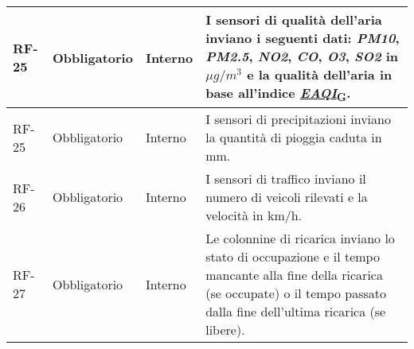 \begin{longtable}{|>{\centering\arraybackslash}m{}|>{\centering\arraybackslash}m{}|>{\centering\arraybackslash}m{}|>{\centering\arraybackslash}m{}|}
	RF-25           & Obbligatorio        & Interno                                                                                                           & I sensori di qualità dell'aria inviano i seguenti dati: \textit{PM10}, \textit{PM2.5}, \textit{NO2}, \textit{CO}, \textit{O3}, \textit{SO2} in $\mu g/m^3$ e la qualità dell'aria in base all'indice \href{https://7last.github.io/docs/rtb/documentazione-interna/glossario\#european-air-quality-index}{\textit{EAQI}\textsubscript{G}}.                                                                                                                                                           \\\hline
	RF-25           & Obbligatorio        & Interno                                                                                                           & I sensori di precipitazioni inviano la quantità di pioggia caduta in mm.                                                                                                                                                                                                                                                                                                                                                                                                                             \\\hline
	RF-26           & Obbligatorio        & Interno                                                                                                           & I sensori di traffico inviano il numero di veicoli rilevati e la velocità in km/h.                                                                                                                                                                                                                                                                                                                                                                                                                   \\\hline
	RF-27           & Obbligatorio        & Interno                                                                                                           & Le colonnine di ricarica inviano lo stato di occupazione e il tempo mancante alla fine della ricarica (se occupate) o il tempo passato dalla fine dell'ultima ricarica (se libere).                                                                                                                                                                                                                                                                                                                  \\\hline

\end{longtable}
